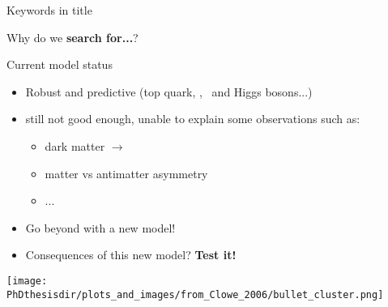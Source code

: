 \begin{frame}{Keywords in title}
\begin{center}
Why do we \textbf{search for...}?
\end{center}

\pause
\begin{minipage}[c]{.45\textwidth}
\begin{block}{Current model status}
\begin{itemize}
\item Robust and predictive (top quark, \Wboson, \Zboson\ and Higgs bosons...)
\item still not good enough, unable to explain some observations such as:
\begin{itemize}
\item dark matter $\longrightarrow$
\item matter vs antimatter asymmetry
\item ...
\end{itemize}
\item Go beyond with a new model!
\item Consequences of this new model? \textbf{\color{ltcolorred}Test it!}
\end{itemize}
\end{block}
\end{minipage}
\hfill
\begin{minipage}[c]{.45\textwidth}
\begin{center}
\texttt{[image: \\PhDthesisdir/plots\_and\_images/from\_Clowe\_2006/bullet\_cluster.png]}
\end{center}
\end{minipage}
\end{frame}

